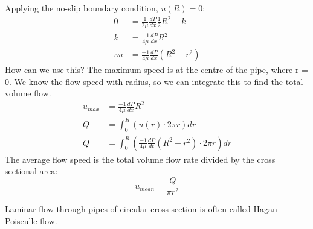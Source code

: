 Applying the no-slip boundary condition, \( u(R) = 0\):
\begin{align}
  0            & = \frac{1}{2\mu} \frac{dP}{dx} \frac{1}{2} R^2 + k \\
  k            & = \frac{-1}{4\mu} \frac{dP}{dx} R^2                \\
  \therefore u & = \frac{-1}{4\mu}\frac{dP}{dx}(R^2 - r^2)
\end{align}
How can we use this? The maximum speed is at the centre of the pipe, where r = 0. We know the flow speed with radius, so we can integrate this to find the total volume flow.
\begin{align}
  u_{max} & = \frac{-1}{4\mu}\frac{dP}{dx} R^2                                                 \\
  Q       & = \int^R_0 \left( u(r)\cdot 2\pi r \right) dr                                      \\
  Q       & = \int^R_0 \left( \frac{-1}{4\mu} \frac{dP}{dt}(R^2 - r^2) \cdot 2\pi r \right) dr
\end{align}
The average flow speed is the total volume flow rate divided by the cross sectional area:
\begin{equation}
  u_{mean} = \frac{Q}{\pi r^2}
\end{equation}
\begin{center}
  Laminar flow through pipes of circular cross section is often called Hagan-Poiseulle flow.
\end{center}